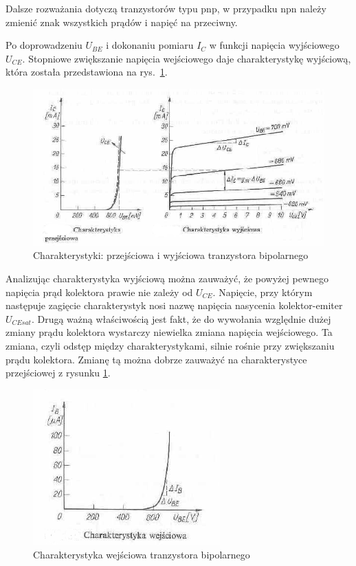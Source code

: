 \documentclass[a4paper,twoside]{report}
\begin{document}
Dalsze rozważania dotyczą tranzystorów typu pnp, w przypadku npn należy zmienić znak wszystkich prądów i napięć na przeciwny.

Po doprowadzeniu $U_{BE}$ i dokonaniu pomiaru $I_C$ w funkcji napięcia wyjściowego $U_{CE}$. Stopniowe zwiększanie napięcia wejściowego daje charakterystykę wyjściową, która została przedstawiona na rys.~\ref{rys:tranBip_ch_przejWyj}.


\begin{figure}[htbp]
\centering
\includegraphics[scale=0.5, width=\linewidth]{obrazy/tranzystory/tranbipcha1.png}
\caption{Charakterystyki: przejściowa i wyjściowa tranzystora bipolarnego}
\label{rys:tranBip_ch_przejWyj}

\end{figure}

Analizując charakterystyka wyjściową można zauważyć, że powyżej pewnego napięcia prąd kolektora prawie nie zależy od $U_{CE}$. Napięcie, przy którym następuje zagięcie charakterystyk nosi nazwę napięcia nasycenia kolektor-emiter $U_{CEsat}$. Drugą ważną właściwością jest fakt, że do wywołania względnie dużej zmiany prądu kolektora wystarczy niewielka zmiana napięcia wejściowego. Ta zmiana, czyli odstęp między charakterystykami, silnie rośnie przy zwiększaniu prądu kolektora. Zmianę tą można dobrze zauważyć na charakterystyce przejściowej z rysunku \ref{rys:tranBip_ch_przejWyj}.

\begin{figure}[htbp]
\centering
\includegraphics[scale=0.8]{obrazy/tranzystory/tranbipcha2.png}
\caption{Charakterystyka wejściowa tranzystora bipolarnego}
\label{rys:tranBip_chWej}
\end{figure}
\end{document}
